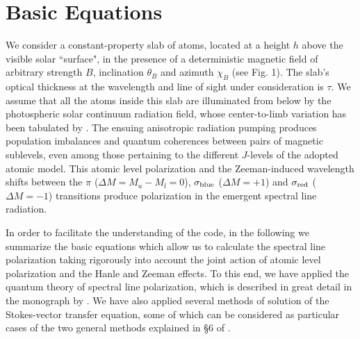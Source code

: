 \documentclass[12pt]{article}
\begin{document}
\section{Basic Equations}
We consider a constant-property slab of atoms, located at a height
$h$ above the 
visible solar ``surface", in the presence of a deterministic magnetic field of
arbitrary strength $B$, 
inclination $\theta_B$ and azimuth $\chi_B$ (see Fig. 1). The slab's optical
thickness at the wavelength 
and line of sight under consideration is $\tau$.
We assume that all the atoms inside this slab are illuminated from below by the
photospheric solar continuum radiation field, whose center-to-limb variation has
been tabulated by \cite{pierce00}. The ensuing anisotropic radiation pumping
produces population imbalances and quantum coherences between pairs of magnetic
sublevels, even among those pertaining to the different $J$-levels of the
adopted atomic model. This atomic level polarization and the Zeeman-induced
wavelength shifts between the $\pi$ ($\Delta{M}=M_u-M_l=0$), $\sigma_{\rm blue}$
($\Delta{M}=+1$) and $\sigma_{\rm red}$ ($\Delta{M}=-1$) transitions produce
polarization in the emergent spectral line radiation.

In order to facilitate the understanding of the code, in 
the following we summarize the basic equations which allow us to 
calculate the spectral line polarization taking rigorously into account the 
joint action of atomic level polarization and the Hanle and Zeeman effects. To this end, we have applied the 
quantum theory of spectral line polarization, which is described in great detail 
in the monograph by \cite{landi_landolfi04}. We have also applied several methods 
of solution of the Stokes-vector transfer equation, some of which can be 
considered as particular cases of the two general methods explained in \S6 of \cite{trujillo03}.
\end{document}
